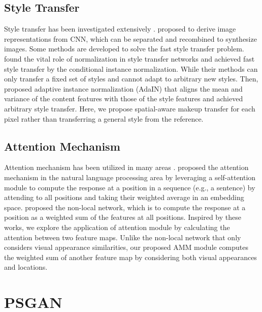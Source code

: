 \subsection{Style Transfer}

Style transfer has been investigated extensively \cite{Gatys2015ANA,Gatys2016PreservingCI,Johnson2016PerceptualLF,Luan2017DeepPS,Taigman2016UnsupervisedCI}. \cite{Gatys2016ImageST} proposed to derive image representations from CNN, which can be separated and recombined to synthesize images. Some methods are developed to solve the fast style transfer problem. \cite{Dumoulin2016ALR} found the vital role of normalization in style transfer networks and achieved fast style transfer by the conditional instance normalization. While their methods can only transfer a fixed set of styles and cannot adapt to arbitrary new styles. Then, \cite{Huang2017ArbitraryST} proposed adaptive instance normalization (AdaIN) that aligns the mean and variance of the content features with those of the style features and achieved arbitrary style transfer. Here, we propose spatial-aware makeup transfer for each pixel rather than transferring a general style from the reference.

 
\subsection{Attention Mechanism}
Attention mechanism has been utilized in many areas \cite{Xu2015ShowAA,Mnih2014RecurrentMO,Hu2017SqueezeandExcitationN,Rush2015ANA}. \cite{Vaswani2017AttentionIA} proposed the attention mechanism in the natural language processing area by leveraging a self-attention module to compute the response at a position in a sequence (e.g., a sentence) by attending to all positions and taking their weighted average in an embedding space.  \cite{Wang2017NonlocalNN} proposed the non-local network, which is to compute the response at a position as a weighted sum of the features at all positions. Inspired by these works, we explore the application of attention module by calculating the attention between two feature maps. Unlike the non-local network that only considers visual appearance similarities, our proposed AMM module computes the weighted sum of another feature map by considering both visual appearances and locations.
\vspace{-2mm}

\section{PSGAN}
